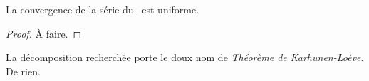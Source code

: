 \begin{remarque}
  La convergence de la série du~ est uniforme.
\end{remarque}
\begin{alert}
  \begin{proof}
    À faire.
  \end{proof}
\end{alert}

\begin{alert}
  La décomposition recherchée porte le doux nom de \emph{\og Théorème
    de Karhunen-Loève\fg{}}. De rien.
\end{alert}


